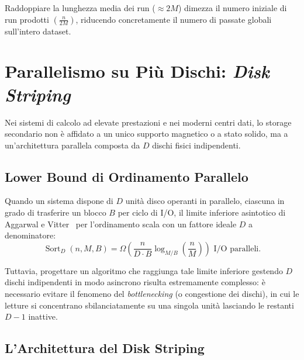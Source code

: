 Raddoppiare la lunghezza media dei run ($\approx 2M$) dimezza il numero iniziale di run prodotti $\left(\frac{n}{2M}\right)$, riducendo concretamente il numero di passate globali sull'intero dataset.

\FloatBarrier
\section{Parallelismo su Pi\`u Dischi: \texorpdfstring{\emph{Disk Striping}}{Disk Striping}}
\label{sec:disk-striping}

Nei sistemi di calcolo ad elevate prestazioni e nei moderni centri dati, lo storage secondario non è affidato a un unico supporto magnetico o a stato solido, ma a un'architettura parallela composta da $D$ dischi fisici indipendenti.

\FloatBarrier
\subsection{Lower Bound di Ordinamento Parallelo}
\label{subsec:parallel-lower-bound}

Quando un sistema dispone di $D$ unità disco operanti in parallelo, ciascuna in grado di trasferire un blocco $B$ per ciclo di I/O, il limite inferiore asintotico di Aggarwal e Vitter~\cite{aggarwal1988} per l'ordinamento scala con un fattore ideale $D$ a denominatore:
\begin{equation}
  \operatorname{Sort}_D(n, M, B) = \Omega\left(\frac{n}{D \cdot B} \log_{M/B}\left(\frac{n}{M}\right)\right) \text{ I/O paralleli}.
\end{equation}

Tuttavia, progettare un algoritmo che raggiunga tale limite inferiore gestendo $D$ dischi indipendenti in modo asincrono risulta estremamente complesso: è necessario evitare il fenomeno del \textit{bottlenecking} (o congestione dei dischi), in cui le letture si concentrano sbilanciatamente su una singola unità lasciando le restanti $D-1$ inattive.

\FloatBarrier
\subsection{L'Architettura del Disk Striping}
\label{subsec:striping-architecture}

